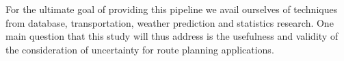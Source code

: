 For the ultimate goal of providing this pipeline we avail ourselves of techniques from database, transportation, weather prediction and statistics research. One main question that this study will thus address is the usefulness and validity of the consideration of uncertainty for route planning applications.
% 




